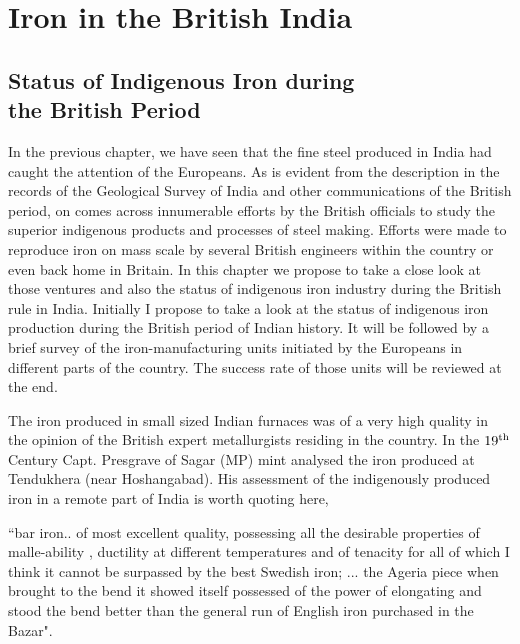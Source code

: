 \chapter{Iron in the British India}\label{chapter6}



\vspace{-.5cm}

\section*{Status of Indigenous Iron during\\ the British Period}\label{chapter6-section-1}

\vspace{-.2cm}

In the previous chapter, we have seen that the fine steel produced in India had caught the attention of the Europeans. As is evident from the description in the records of the Geological Survey of India and other communications of the British period, on comes across innumerable efforts by the British officials to study the superior indigenous products and processes of steel making. Efforts were made to reproduce iron on mass scale by several British engineers within the country or even back home in Britain. In this chapter we propose to take a close look at those ventures and also the status of indigenous iron industry during the British rule in India. Initially I propose to take a look at the status of indigenous iron production during the British period of Indian history. It will be followed by a brief survey of the iron-manufacturing units initiated by the Europeans in different parts of the country. The success rate of those units will be reviewed at the end.

The iron produced in small sized Indian furnaces was of a very high quality in the opinion of the British expert metallurgists residing in the country.  In the $19^{\rm th}$ Century Capt. Presgrave of Sagar (MP) mint analysed the iron produced at Tendukhera (near Hoshangabad).  His assessment of the indigenously produced iron in a remote part of India is worth quoting here,

\footnotesize{``bar iron.. of most excellent quality, possessing all the desirable properties of malle-\break ability , ductility at different temperatures and of tenacity for all of which I think it cannot be surpassed by the best Swedish iron; ... the Ageria piece when brought to the bend it showed itself possessed of the power of elongating and stood the bend better than the general run of English iron purchased in the Bazar".}

